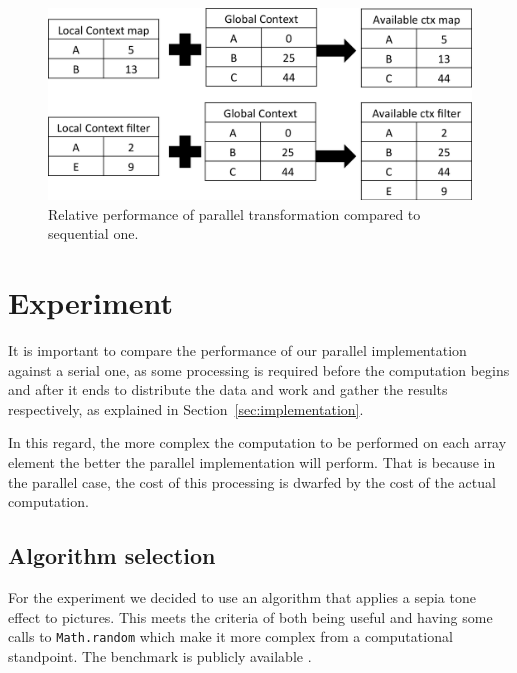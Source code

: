 \documentclass[runningheads,a4paper]{llncs}
\begin{document}
\begin{figure}
\centering
\includegraphics[width=1\textwidth]{context}
\caption{Relative performance of parallel transformation compared to sequential one.}
\label{fig:context}
\end{figure}

\section{Experiment}\label{sec:experiment}
It is important to compare the performance of our parallel implementation against a serial one, as some processing is required before the computation begins and after it ends to distribute the data and work and gather the results respectively, as explained in Section~\ref{sec:implementation}.

In this regard, the more complex the computation to be performed on each array element the better the parallel implementation will perform. That is because in the parallel case, the cost of this processing is dwarfed by the cost of the actual computation.

\subsection{Algorithm selection}
For the experiment we decided to use an algorithm that applies a sepia tone effect to pictures. This meets the criteria of both being useful and having some calls to \verb+Math.random+ which make it more complex from a computational standpoint. The benchmark is publicly available \cite{benchmark}.
\end{document}
